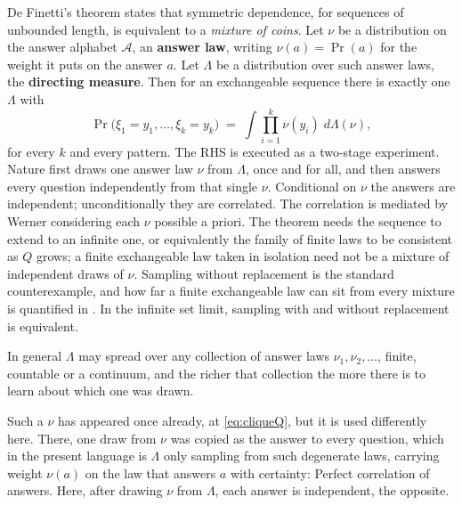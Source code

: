 \documentclass[11pt]{article}
\begin{document}
De Finetti's theorem \cite{definetti37,hewittsavage} states that
symmetric dependence, for sequences of unbounded length, is equivalent to a \emph{mixture of coins}. 
Let $\nu$ be a distribution on the answer alphabet $\mathcal A$, an \textbf{answer law}, writing
$\nu(a) = \Pr(a)$ for the weight it puts on the answer $a$. Let $\Lambda$
be a distribution over such answer laws, the \textbf{directing
measure}. Then for an exchangeable sequence there is exactly one
$\Lambda$ with
%
\begin{equation}
  \Pr\big(\xi_1 = y_1, \ldots, \xi_k = y_k\big)
  \;=\; \int \prod_{i=1}^{k} \nu(y_i)\; d\Lambda(\nu) ,
  \label{eq:definetti}
\end{equation}
%
for every $k$ and every pattern. The RHS is executed as a
two-stage experiment. Nature first draws one answer law $\nu$ from
$\Lambda$, once and for all, and then answers every question
independently from that single $\nu$. Conditional on $\nu$ the answers
are independent; unconditionally they are correlated. The
correlation is mediated by Werner considering each $\nu$ possible a priori.
The theorem needs the sequence to extend to an infinite one, or
equivalently the family of finite laws to be consistent as $Q$ grows;
a finite exchangeable law taken in isolation need not be a mixture of
independent draws of $\nu$. Sampling without replacement is the standard
counterexample, and how far a finite exchangeable law can sit from every
mixture is quantified in \cite{diaconisfreedman80}. In the infinite set limit, sampling with and without replacement is 
equivalent.

In general $\Lambda$ may spread over any collection of answer laws
$\nu_1, \nu_2, \ldots$, finite, countable or a continuum, and the
richer that collection the more there is to learn about which one was
drawn.

Such a $\nu$ has appeared once already, at \eqref{eq:cliqueQ}, but it 
is used differently here. There, one draw from $\nu$
was copied as the answer to every question, which in the present language is
$\Lambda$ only sampling from such degenerate laws, carrying weight $\nu(a)$ on
the law that answers $a$ with certainty: Perfect correlation of answers. Here, after drawing $\nu$ from $\Lambda$, each 
answer is independent, the opposite.
\end{document}
